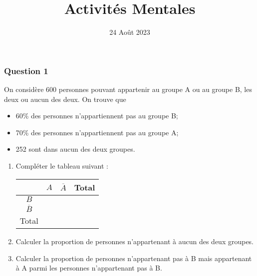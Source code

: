 \documentclass[15pt, mathserif]{beamer}
\title{Activités Mentales}
\date{24 Août 2023}
\begin{document}
\begin{frame}
    \titlepage
\end{frame}

\begin{frame} 
	\frametitle{Question 1}
On considère 600 personnes pouvant appartenir au groupe A ou au groupe B, les deux ou aucun des deux. On trouve que 
 \begin{itemize} 
 \item 60\%  des personnes n'appartiennent pas au groupe B; 
 \item 70\% des personnes n'appartiennent pas au groupe A; 
 \item 252 sont dans aucun des deux groupes.
 \end{itemize} 
 \begin{enumerate} 
 \item Compléter le tableau suivant : 
 \hfil \begin{tabular}{|c|c|c|c|} 
 \cline{2-4}   
 \multicolumn{1}{c|}{} & $A$ & $\overline{A}$ & Total\\ \hline 
 $B$  &    & &   \\\hline 
 $\overline{B}$   &  &    &    \\\hline	
 Total   & &  &  \\\hline  
 \end{tabular} 
 \item Calculer la proportion de personnes n'appartenant  à aucun des deux groupes. 
 \item Calculer la proportion de personnes n'appartenant pas à B mais appartenant à A parmi les personnes n'appartenant pas à B. 
  \end{enumerate} 
 \end{frame}
\end{document}
